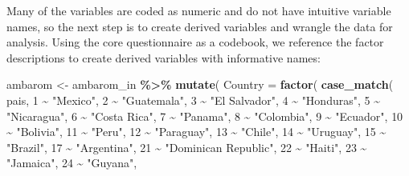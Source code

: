 \documentclass[
]{krantz}
\makeatletter
\newenvironment{Shaded}{\begin{snugshade}}{\end{snugshade}}
\newcommand{\AttributeTok}[1]{\textcolor[rgb]{0.27,0.27,0.27}{#1}}
\newcommand{\DecValTok}[1]{\textcolor[rgb]{0.06,0.06,0.06}{#1}}
\newcommand{\FunctionTok}[1]{\textcolor[rgb]{0.27,0.27,0.27}{\textbf{#1}}}
\newcommand{\NormalTok}[1]{#1}
\newcommand{\OtherTok}[1]{\textcolor[rgb]{0.37,0.37,0.37}{#1}}
\newcommand{\SpecialCharTok}[1]{\textcolor[rgb]{0.43,0.43,0.43}{\textbf{#1}}}
\newcommand{\StringTok}[1]{\textcolor[rgb]{0.5,0.5,0.5}{#1}}
\newenvironment{kframe}{%
\medskip{}
\setlength{\fboxsep}{.8em}
 \def\at@end@of@kframe{}%
 \ifinner\ifhmode%
  \def\at@end@of@kframe{\end{minipage}}%
  \begin{minipage}{\columnwidth}%
 \fi\fi%
 \def\FrameCommand##1{\hskip\@totalleftmargin \hskip-\fboxsep
 \colorbox{shadecolor}{##1}\hskip-\fboxsep
     \hskip-\linewidth \hskip-\@totalleftmargin \hskip\columnwidth}%
 \MakeFramed {\advance\hsize-\width
   \@totalleftmargin\z@ \linewidth\hsize
   \@setminipage}}%
 {\par\unskip\endMakeFramed%
 \at@end@of@kframe}
\renewenvironment{Shaded}{\begin{kframe}}{\end{kframe}}
\makeatother
\begin{document}
Many of the variables are coded as numeric and do not have intuitive variable names, so the next step is to create derived variables and wrangle the data for analysis. Using the core questionnaire as a codebook, we reference the factor descriptions to create derived variables with informative names:

\begin{Shaded}
\begin{Highlighting}[]
\NormalTok{ambarom }\OtherTok{\textless{}{-}}\NormalTok{ ambarom\_in }\SpecialCharTok{\%\textgreater{}\%}
  \FunctionTok{mutate}\NormalTok{(}
    \AttributeTok{Country =} \FunctionTok{factor}\NormalTok{(}
      \FunctionTok{case\_match}\NormalTok{(}
\NormalTok{        pais,}
        \DecValTok{1} \SpecialCharTok{\textasciitilde{}} \StringTok{"Mexico"}\NormalTok{,}
        \DecValTok{2} \SpecialCharTok{\textasciitilde{}} \StringTok{"Guatemala"}\NormalTok{,}
        \DecValTok{3} \SpecialCharTok{\textasciitilde{}} \StringTok{"El Salvador"}\NormalTok{,}
        \DecValTok{4} \SpecialCharTok{\textasciitilde{}} \StringTok{"Honduras"}\NormalTok{,}
        \DecValTok{5} \SpecialCharTok{\textasciitilde{}} \StringTok{"Nicaragua"}\NormalTok{,}
        \DecValTok{6} \SpecialCharTok{\textasciitilde{}} \StringTok{"Costa Rica"}\NormalTok{,}
        \DecValTok{7} \SpecialCharTok{\textasciitilde{}} \StringTok{"Panama"}\NormalTok{,}
        \DecValTok{8} \SpecialCharTok{\textasciitilde{}} \StringTok{"Colombia"}\NormalTok{,}
        \DecValTok{9} \SpecialCharTok{\textasciitilde{}} \StringTok{"Ecuador"}\NormalTok{,}
        \DecValTok{10} \SpecialCharTok{\textasciitilde{}} \StringTok{"Bolivia"}\NormalTok{,}
        \DecValTok{11} \SpecialCharTok{\textasciitilde{}} \StringTok{"Peru"}\NormalTok{,}
        \DecValTok{12} \SpecialCharTok{\textasciitilde{}} \StringTok{"Paraguay"}\NormalTok{,}
        \DecValTok{13} \SpecialCharTok{\textasciitilde{}} \StringTok{"Chile"}\NormalTok{,}
        \DecValTok{14} \SpecialCharTok{\textasciitilde{}} \StringTok{"Uruguay"}\NormalTok{,}
        \DecValTok{15} \SpecialCharTok{\textasciitilde{}} \StringTok{"Brazil"}\NormalTok{,}
        \DecValTok{17} \SpecialCharTok{\textasciitilde{}} \StringTok{"Argentina"}\NormalTok{,}
        \DecValTok{21} \SpecialCharTok{\textasciitilde{}} \StringTok{"Dominican Republic"}\NormalTok{,}
        \DecValTok{22} \SpecialCharTok{\textasciitilde{}} \StringTok{"Haiti"}\NormalTok{,}
        \DecValTok{23} \SpecialCharTok{\textasciitilde{}} \StringTok{"Jamaica"}\NormalTok{,}
        \DecValTok{24} \SpecialCharTok{\textasciitilde{}} \StringTok{"Guyana"}\NormalTok{,}

\end{Highlighting}
\end{Shaded}
\end{document}
